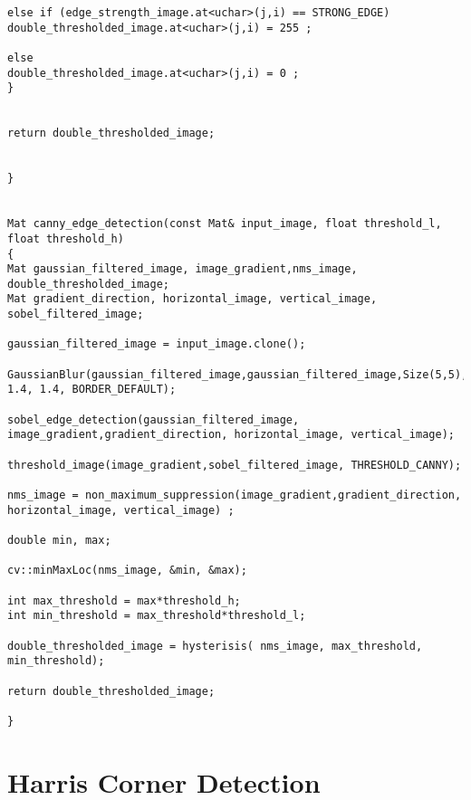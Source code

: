 \begin{lstlisting}
else if (edge_strength_image.at<uchar>(j,i) == STRONG_EDGE)
double_thresholded_image.at<uchar>(j,i) = 255 ; 

else
double_thresholded_image.at<uchar>(j,i) = 0 ;
}


return double_thresholded_image;


}


Mat canny_edge_detection(const Mat& input_image, float threshold_l, float threshold_h)
{
Mat gaussian_filtered_image, image_gradient,nms_image, double_thresholded_image;
Mat gradient_direction, horizontal_image, vertical_image, sobel_filtered_image;

gaussian_filtered_image = input_image.clone();

GaussianBlur(gaussian_filtered_image,gaussian_filtered_image,Size(5,5), 1.4, 1.4, BORDER_DEFAULT);

sobel_edge_detection(gaussian_filtered_image, image_gradient,gradient_direction, horizontal_image, vertical_image);

threshold_image(image_gradient,sobel_filtered_image, THRESHOLD_CANNY);

nms_image = non_maximum_suppression(image_gradient,gradient_direction, horizontal_image, vertical_image) ;

double min, max;

cv::minMaxLoc(nms_image, &min, &max);

int max_threshold = max*threshold_h;
int min_threshold = max_threshold*threshold_l;

double_thresholded_image = hysterisis( nms_image, max_threshold, min_threshold);

return double_thresholded_image;

}

\end{lstlisting}

\pagebreak
\section{Harris Corner Detection}

